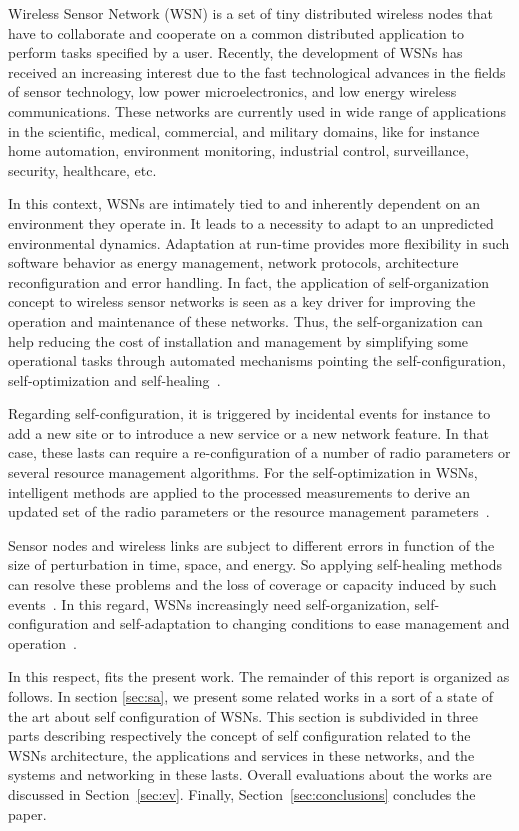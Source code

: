 Wireless Sensor Network (WSN) is a set of tiny distributed wireless nodes that have to collaborate and cooperate on a common distributed application to perform tasks specified by a user. Recently, the development of WSNs has received an increasing interest due to the fast technological advances in the fields of sensor technology, low power microelectronics, and low energy wireless communications.
These networks are currently used in wide range of applications in the scientific, medical, commercial, and military domains, like for instance home automation, environment monitoring, industrial control, surveillance, security, healthcare, etc. 

In this context, WSNs are intimately tied to and inherently dependent on an environment they operate in. It leads to a necessity to adapt to an unpredicted environmental dynamics. Adaptation at run-time provides more flexibility in such software behavior as energy management, network protocols, architecture reconfiguration and error handling.
In fact, the application of self-organization concept to wireless sensor networks is seen as a key driver for improving the operation and maintenance of these networks. Thus, the self-organization can help reducing the cost of installation and management by simplifying some operational tasks through automated mechanisms pointing the self-configuration, self-optimization and self-healing~\cite{son_marchetti}.

Regarding self-configuration, it is triggered by incidental events for instance to add a new site or to introduce a new service or a new network feature. In that case, these lasts can require a re-configuration of a number of radio parameters or several resource management algorithms.
For the self-optimization in WSNs, intelligent methods are applied to the processed measurements to derive an updated set of the radio parameters or the resource management parameters~\cite{son_marchetti}.

Sensor nodes and wireless links are subject to different errors in function of the size of perturbation in time, space, and energy. So applying self-healing methods can resolve these problems and the loss of coverage or capacity induced by such events~\cite{son_marchetti}.
In this regard, WSNs increasingly need self-organization, self-configuration and self-adaptation to changing conditions to ease management and operation~\cite{son_sengul}.

In this respect, fits the present work.
The remainder of this report is organized as follows. In section
\ref{sec:sa}, we present some related works in a sort of a state of the art
about self configuration of WSNs. This section is subdivided in three parts
describing respectively the concept of self configuration related to the WSNs architecture, the applications and services in these networks, and the systems
and networking in these lasts. Overall evaluations about the works are
discussed in Section~\ref{sec:ev}. Finally, Section~\ref{sec:conclusions} concludes the paper.
